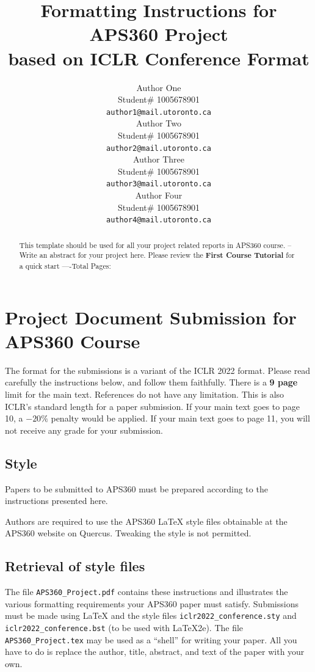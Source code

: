 \documentclass{article} %
\title{Formatting Instructions for APS360 Project  \\ 
based on ICLR Conference Format}
\author{Author One  \\
Student\# 1005678901\\
\texttt{author1@mail.utoronto.ca} \\
\And
Author Two  \\
Student\# 1005678901 \\
\texttt{author2@mail.utoronto.ca} \\
\AND
Author Three  \\
Student\# 1005678901 \\
\texttt{author3@mail.utoronto.ca} \\
\And
Author Four \\
Student\# 1005678901 \\
\texttt{author4@mail.utoronto.ca} \\
\AND
}
\begin{document}
\maketitle

\begin{abstract}
This template should be used for all your project related reports in APS360 course. -- Write an abstract for your project here. Please review the \textbf{ First Course Tutorial} for a quick start
----Total Pages: \pageref{last_page}
\end{abstract}



\section{Project Document Submission for APS360 Course}


The format for the submissions is a variant of the ICLR 2022 format.
Please read carefully the instructions below, and follow them
faithfully. There is a \textbf{9 page} limit for the main text. References do not have any limitation. This is also ICLR's standard length for a paper submission. 
If your main text goes to page 10, a $-20\%$ penalty would be applied. If your main text goes to page 11, you will not receive any grade for your submission. 

\subsection{Style}

Papers to be submitted to APS360 must be prepared according to the
instructions presented here.

Authors are required to use the APS360 \LaTeX{} style files obtainable at the
APS360 website on Quercus. Tweaking the style is not permitted.

\subsection{Retrieval of style files}

The file \verb+APS360_Project.pdf+ contains these
instructions and illustrates the various formatting requirements your APS360 paper must satisfy.
Submissions must be made using \LaTeX{} and the style files
\verb+iclr2022_conference.sty+ and \verb+iclr2022_conference.bst+ (to be used with \LaTeX{}2e). The file
\verb+APS360_Project.tex+ may be used as a ``shell'' for writing your paper. All you have to do is replace the author, title, abstract, and text of the paper with
your own.
\end{document}
